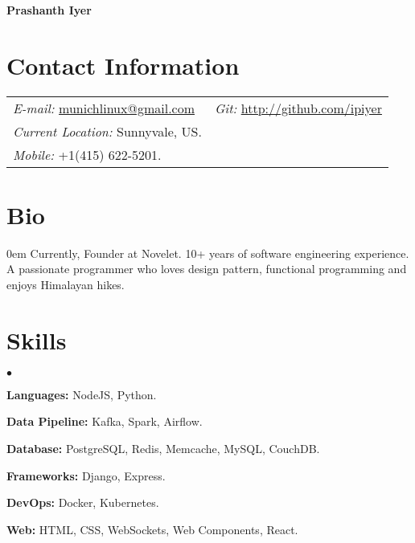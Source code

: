 \documentclass[margin, line, 10pt]{res}
\newenvironment{list2}{
  \begin{list}{$\bullet$}{%
      \setlength{\itemsep}{0in}
      \setlength{\parsep}{0in} \setlength{\parskip}{0in}
      \setlength{\topsep}{0in} \setlength{\partopsep}{0in}
      \setlength{\leftmargin}{0.2in}}}{\end{list}}
\begin{document}
 \textbf{\LARGE Prashanth Iyer}
\vspace{.1cm} \\
\begin{resume}

\section{Contact Information}
\vspace{.05in}
\begin{tabular}{@{}p{3in}p{3in}}
{\it E-mail:} \href{mailto:munichlinux@gmail.com}{munichlinux@gmail.com} & {\it Git:} \href{http://github.com/ipiyer}{http://github.com/ipiyer} \\
{\it Current Location:} Sunnyvale, US. \\
{\it Mobile:}  +1(415) 622-5201.
\end{tabular}

\section{Bio}
\begin{addmargin}{0em}
Currently, Founder at Novelet. 10+ years of software engineering experience. A passionate programmer who loves design pattern, functional programming and enjoys Himalayan hikes.\\
\end{addmargin}
\vspace{-.15in}

\section{Skills}
\begin{list2}
\item {\bf Languages:} NodeJS, Python.\\
  \vspace{-.3cm}
\item {\bf Data Pipeline:} Kafka, Spark, Airflow.\\
  \vspace{-.3cm}
\item {\bf Database:} PostgreSQL, Redis, Memcache, MySQL, CouchDB.\\
  \vspace{-.3cm}
\item {\bf Frameworks:} Django, Express.\\
  \vspace{-.3cm}
\item {\bf DevOps:} Docker, Kubernetes.\\
  \vspace{-.3cm}
\item {\bf Web:} HTML, CSS, WebSockets, Web Components, React.\\
  \vspace{-.3cm}
\end{list2}


\end{resume}
\end{document}
